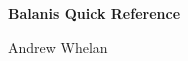 \documentclass{article}
\begin{document}
\newcommand{\angFreq}{\omega}
\newcommand{\cPoynt}{\mathbf{S}}
\newcommand{\cond}{\sigma}
\newcommand{\defeq}{\overset{\mathclap{\text{def}}}{=}}
\newcommand{\permitt}{\epsilon}
\newcommand{\eFreq}{\mathbf{E}}
\newcommand{\eqBy}[1]{\overset{\mathclap{\eqref{#1}}}{=}}
\newcommand{\eTime}{\mathscr{E}}
\newcommand{\fourier}{\mathcal{F}}
\newcommand{\hFreq}{\mathbf{H}}
\newcommand{\hTime}{\mathscr{H}}
\newcommand{\im}{j}
\newcommand{\permeab}{\mu}
\newcommand{\poynt}{\mathscr{S}}
\newcommand{\poyntAvg}{\langle \poynt \rangle}
\newcommand{\propConst}{\gamma}
\newcommand{\reals}{\mathbb{R}}
\begin{titlepage}
   \centering

   {\Large\bfseries Balanis Quick Reference \par}

   {\Large Andrew Whelan \par}
   \vspace{0.2cm}

   \tableofcontents
   \vspace*{\fill}  %
\end{titlepage}
\end{document}
